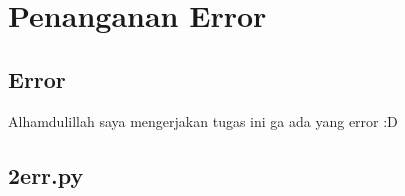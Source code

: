 \chapter{Penanganan Error}

\section{Error}
Alhamdulillah saya mengerjakan tugas ini ga ada yang error :D

\section{2err.py}
